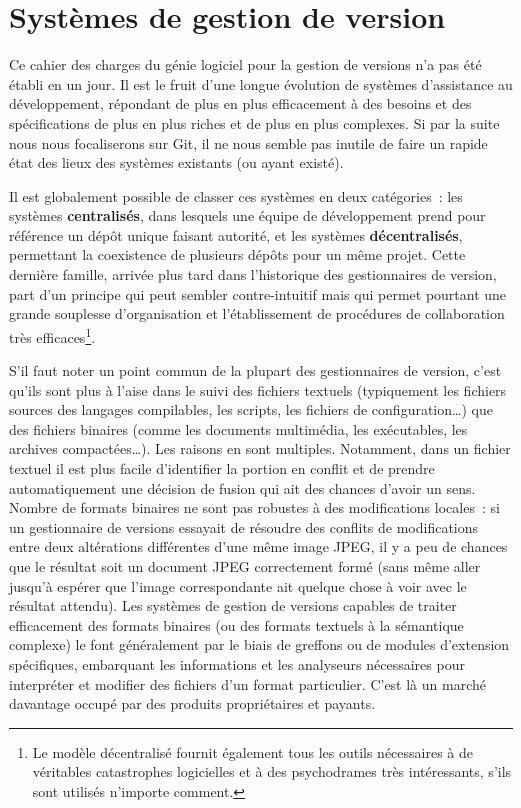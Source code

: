 \section{Systèmes de gestion de version}

Ce cahier des charges du génie logiciel pour la gestion de versions
n'a pas été établi en un jour. Il est le fruit d'une longue évolution
de systèmes d'assistance au développement, répondant de plus en plus
efficacement à des besoins et des spécifications de plus en plus
riches et de plus en plus complexes. Si par la suite nous nous
focaliserons sur Git, il ne nous semble pas inutile de faire un rapide
état des lieux des systèmes existants (ou ayant existé).

Il est globalement possible de classer ces systèmes en deux
catégories~: les systèmes \textbf{centralisés}, dans lesquels une
équipe de développement prend pour référence un dépôt unique faisant
autorité, et les systèmes \textbf{décentralisés}, permettant la
coexistence de plusieurs dépôts pour un même projet. Cette dernière
famille, arrivée plus tard dans l'historique des gestionnaires de
version, part d'un principe qui peut sembler contre-intuitif mais qui
permet pourtant une grande souplesse d'organisation et l'établissement
de procédures de collaboration très efficaces\footnote{Le modèle
  décentralisé fournit également tous les outils nécessaires à de
  véritables catastrophes logicielles et à des psychodrames très
  intéressants, s'ils sont utilisés n'importe comment.}.

S'il faut noter un point commun de la plupart des gestionnaires de
version, c'est qu'ils sont plus à l'aise dans le suivi des fichiers
textuels (typiquement les fichiers sources des langages compilables,
les scripts, les fichiers de configuration\ldots) que des fichiers
binaires (comme les documents multimédia, les exécutables, les
archives compactées\ldots). Les raisons en sont multiples. Notamment,
dans un fichier textuel il est plus facile d'identifier la portion en
conflit et de prendre automatiquement une décision de fusion qui ait
des chances d'avoir un sens. Nombre de formats binaires ne sont pas
robustes à des modifications locales~: si un gestionnaire de versions
essayait de résoudre des conflits de modifications entre deux
altérations différentes d'une même image JPEG, il y a peu de chances
que le résultat soit un document JPEG correctement formé (sans même
aller jusqu'à espérer que l'image correspondante ait quelque chose à
voir avec le résultat attendu). Les systèmes de gestion de versions
capables de traiter efficacement des formats binaires (ou des formats
textuels à la sémantique complexe) le font généralement par le biais
de greffons ou de modules d'extension spécifiques, embarquant les
informations et les analyseurs nécessaires pour interpréter et
modifier des fichiers d'un format particulier. C'est là un marché
davantage occupé par des produits propriétaires et payants.

